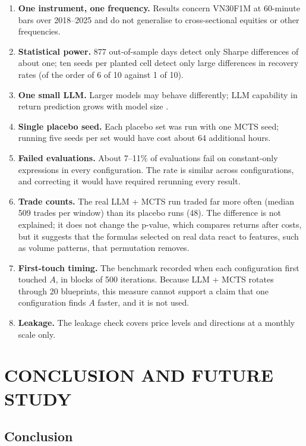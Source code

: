 \documentclass[12pt,a4paper,oneside]{book}
\theoremstyle{definition}
\begin{document}
\begin{enumerate}
  \item \textbf{One instrument, one frequency.} Results concern VN30F1M at 60-minute bars over 2018--2025 and do not generalise to cross-sectional equities or other frequencies.
  \item \textbf{Statistical power.} 877 out-of-sample days detect only Sharpe differences of about one; ten seeds per planted cell detect only large differences in recovery rates (of the order of 6 of 10 against 1 of 10).
  \item \textbf{One small LLM.} Larger models may behave differently; LLM capability in return prediction grows with model size \cite{lopezlira2023}.
  \item \textbf{Single placebo seed.} Each placebo set was run with one MCTS seed; running five seeds per set would have cost about 64 additional hours.
  \item \textbf{Failed evaluations.} About 7--11\% of evaluations fail on constant-only expressions in every configuration. The rate is similar across configurations, and correcting it would have required rerunning every result.
  \item \textbf{Trade counts.} The real LLM + MCTS run traded far more often (median 509 trades per window) than its placebo runs (48). The difference is not explained; it does not change the p-value, which compares returns after costs, but it suggests that the formulas selected on real data react to features, such as volume patterns, that permutation removes.
  \item \textbf{First-touch timing.} The benchmark recorded when each configuration first touched $A$, in blocks of 500 iterations. Because LLM + MCTS rotates through 20 blueprints, this measure cannot support a claim that one configuration finds $A$ faster, and it is not used.
  \item \textbf{Leakage.} The leakage check covers price levels and directions at a monthly scale only.
\end{enumerate}

\chapter{CONCLUSION AND FUTURE STUDY}
\label{ch6}

\section{Conclusion}
\end{document}
